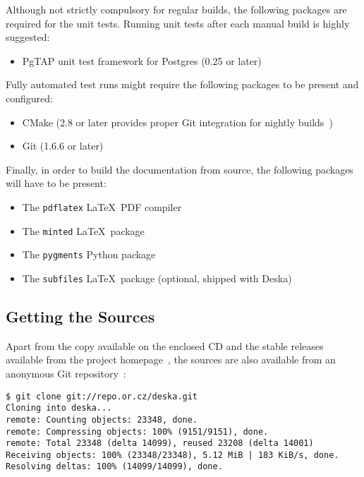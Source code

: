\documentclass[deska]{subfiles}
\begin{document}
Although not strictly compulsory for regular builds, the following packages are required for the unit tests.  Running
unit tests after each manual build is highly suggested:

\begin{itemize}
    \item PgTAP unit test framework for Postgres (0.25 or later)~\cite{pgtap}
\end{itemize}

Fully automated test runs might require the following packages to be present and configured:

\begin{itemize}
    \item CMake (2.8 or later provides proper Git integration for nightly builds~\cite{deska-dashboard})
    \item Git (1.6.6 or later)
\end{itemize}

Finally, in order to build the documentation from source, the following packages will have to be present:

\begin{itemize}
    \item The {\tt pdflatex} \LaTeX~PDF compiler
    \item The {\tt minted} \LaTeX~package~\cite{latex-minted}
    \item The {\tt pygments} Python package~\cite{pygments}
    \item The {\tt subfiles} \LaTeX~package (optional, shipped with Deska)~\cite{latex-subfiles}
\end{itemize}

\subsection{Getting the Sources}

Apart from the copy available on the enclosed CD and the stable releases available from the project
homepage~\cite{deska-project}, the sources are also available from an anonymous Git repository~\cite{deska-git}:

\begin{verbatim}
$ git clone git://repo.or.cz/deska.git
Cloning into deska...
remote: Counting objects: 23348, done.
remote: Compressing objects: 100% (9151/9151), done.
remote: Total 23348 (delta 14099), reused 23208 (delta 14001)
Receiving objects: 100% (23348/23348), 5.12 MiB | 183 KiB/s, done.
Resolving deltas: 100% (14099/14099), done.
\end{verbatim}
\end{document}
